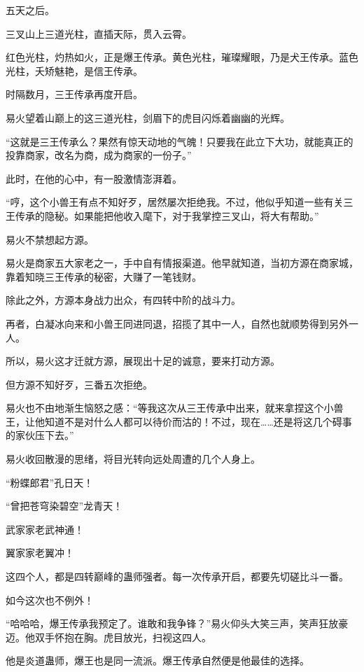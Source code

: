 
\begin{this_body}

五天之后。

三叉山上三道光柱，直插天际，贯入云霄。

红色光柱，灼热如火，正是爆王传承。黄色光柱，璀璨耀眼，乃是犬王传承。蓝色光柱，夭矫魅艳，是信王传承。

时隔数月，三王传承再度开启。

易火望着山巅上的这三道光柱，剑眉下的虎目闪烁着幽幽的光辉。

“这就是三王传承么？果然有惊天动地的气魄！只要我在此立下大功，就能真正的投靠商家，改名为商，成为商家的一份子。”

此时，在他的心中，有一股激情澎湃着。

“哼，这个小兽王有点不知好歹，居然屡次拒绝我。不过，他似乎知道一些有关三王传承的隐秘。如果能把他收入麾下，对于我掌控三叉山，将大有帮助。”

易火不禁想起方源。

易火是商家五大家老之一，手中自有情报渠道。他早就知道，当初方源在商家城，靠着知晓三王传承的秘密，大赚了一笔钱财。

除此之外，方源本身战力出众，有四转中阶的战斗力。

再者，白凝冰向来和小兽王同进同退，招揽了其中一人，自然也就顺势得到另外一人。

所以，易火这才迁就方源，展现出十足的诚意，要来打动方源。

但方源不知好歹，三番五次拒绝。

易火也不由地渐生恼怒之感：“等我这次从三王传承中出来，就来拿捏这个小兽王，让他知道不是对什么人都可以待价而沽的！不过，现在……还是将这几个碍事的家伙压下去。”

易火收回散漫的思绪，将目光转向远处周遭的几个人身上。

“粉蝶郎君”孔日天！

“曾把苍穹染碧空”龙青天！

武家家老武神通！

翼家家老翼冲！

这四个人，都是四转巅峰的蛊师强者。每一次传承开启，都要先切磋比斗一番。

如今这次也不例外！

“哈哈哈，爆王传承我预定了。谁敢和我争锋？”易火仰头大笑三声，笑声狂放豪迈。他双手怀抱在胸。虎目放光，扫视这四人。

他是炎道蛊师，爆王也是同一流派。爆王传承自然便是他最佳的选择。


\end{this_body}
